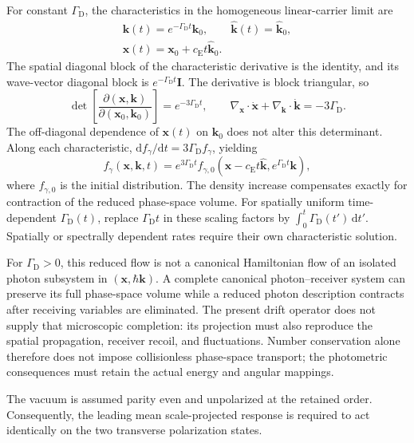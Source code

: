For constant $\Gamma_{\mathrm D}$, the characteristics in the homogeneous
linear-carrier limit are
\[
\begin{gathered}
    \mathbf{k}(t)=e^{-\Gamma_{\mathrm D}t}\mathbf{k}_0,
    \qquad
    \hat{\mathbf{k}}(t)=\hat{\mathbf{k}}_0,\\
    \mathbf{x}(t)=\mathbf{x}_0+c_{\mathrm E}t\hat{\mathbf{k}}_0.
\end{gathered}
\]
The spatial diagonal block of the characteristic derivative is the identity,
and its wave-vector diagonal block is
$e^{-\Gamma_{\mathrm D}t}\mathbf I$. The derivative is block triangular, so
\[
    \det\!\left[
        \frac{\partial(\mathbf x,\mathbf k)}
             {\partial(\mathbf x_0,\mathbf k_0)}
    \right]
    =e^{-3\Gamma_{\mathrm D}t},
    \qquad
    \nabla_{\mathbf x}\cdot\dot{\mathbf x}
    +\nabla_{\mathbf k}\cdot\dot{\mathbf k}
    =-3\Gamma_{\mathrm D}.
\]
The off-diagonal dependence of $\mathbf x(t)$ on $\mathbf k_0$ does not
alter this determinant. Along each characteristic,
$\mathrm d f_{\gamma}/\mathrm dt=3\Gamma_{\mathrm D}f_{\gamma}$, yielding
\[
    f_{\gamma}(\mathbf x,\mathbf k,t)
    =e^{3\Gamma_{\mathrm D}t}
      f_{\gamma,0}\!\left(
          \mathbf x-c_{\mathrm E}t\hat{\mathbf k},
          e^{\Gamma_{\mathrm D}t}\mathbf k
      \right),
\]
where $f_{\gamma,0}$ is the initial distribution. The density increase
compensates exactly for contraction of the reduced phase-space volume.
For spatially uniform time-dependent $\Gamma_{\mathrm D}(t)$, replace
$\Gamma_{\mathrm D}t$ in these scaling factors by
$\int_0^t\Gamma_{\mathrm D}(t')\,\mathrm dt'$. Spatially or spectrally
dependent rates require their own characteristic solution.

For $\Gamma_{\mathrm D}>0$, this reduced flow is not a canonical Hamiltonian
flow of an isolated photon subsystem in $(\mathbf x,\hbar\mathbf k)$.
A complete canonical photon--receiver system can preserve its full
phase-space volume while a reduced photon description contracts after
receiving variables are eliminated. The present drift operator does not
supply that microscopic completion: its projection must also reproduce the
spatial propagation, receiver recoil, and fluctuations. Number conservation
alone therefore does not impose collisionless phase-space transport; the
photometric consequences must retain the actual energy and angular mappings.

The vacuum is assumed parity even and unpolarized at the retained order.
Consequently, the leading mean scale-projected response is required to act
identically on the two transverse polarization states.


